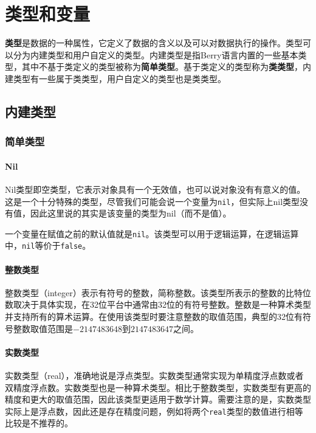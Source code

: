 \chapter{类型和变量}

\textbf{类型}是数据的一种属性，它定义了数据的含义以及可以对数据执行的操作。类型可以分为内建类型和用户自定义的类型。内建类型是指Berry语言内置的一些基本类型，其中不基于类定义的类型被称为\textbf{简单类型}。基于类定义的类型称为\textbf{类类型}，内建类型有一些属于类类型，用户自定义的类型也是类类型。

\section{内建类型}

\subsection{简单类型}

\subsubsection{Nil}

Nil类型即空类型，它表示对象具有一个无效值，也可以说对象没有有意义的值。这是一个十分特殊的类型，尽管我们可能会说一个变量为\texttt{nil}，但实际上nil类型没有值，因此这里说的其实是该变量的类型为nil（而不是值）。

一个变量在赋值之前的默认值就是\texttt{nil}。该类型可以用于逻辑运算，在逻辑运算中，\texttt{nil}等价于\texttt{false}。

\subsubsection{整数类型}

整数类型（integer）表示有符号的整数，简称整数。该类型所表示的整数的比特位数取决于具体实现，在32位平台中通常由32位的有符号整数。整数是一种算术类型并支持所有的算术运算。在使用该类型时要注意整数的取值范围，典型的32位有符号整数取值范围是$-2147483648$到$2147483647$之间。

\subsubsection{实数类型}

实数类型（real），准确地说是浮点类型。实数类型通常实现为单精度浮点数或者双精度浮点数。实数类型也是一种算术类型。相比于整数类型，实数类型有更高的精度和更大的取值范围，因此该类型更适用于数学计算。需要注意的是，实数类型实际上是浮点数，因此还是存在精度问题，例如将两个\texttt{real}类型的数值进行相等比较是不推荐的。

